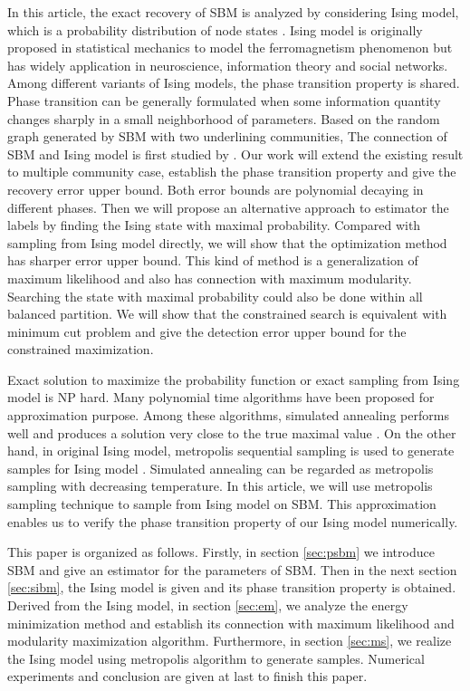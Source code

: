 \documentclass[journal]{IEEEtran}
\newcommand{\1}{\mathbbm{1}}
\begin{document}
In this article, the exact recovery of SBM is analyzed by considering
Ising model, which is a probability distribution of node states \cite{ising1925beitrag}.
Ising model is originally proposed in statistical mechanics to model the ferromagnetism phenomenon but has widely application in neuroscience, information theory
and social networks. Among different variants of Ising models, the phase transition property is shared. Phase transition can be generally formulated when
some information quantity changes sharply in a small neighborhood of parameters.
Based on the random graph generated by SBM with two underlining communities,
The connection of SBM and Ising model is first studied by \cite{ye2020exact}. Our work will extend the existing result to multiple community case, establish the phase transition
property and give the recovery error upper bound. Both error bounds are polynomial decaying in different phases.
Then we will propose an alternative approach to estimator the labels by finding the Ising state with maximal probability.
Compared with sampling from Ising model directly,
we will show that the optimization method has sharper error upper bound. This kind of method
is a generalization of maximum likelihood and also has connection with maximum modularity.
Searching the state with maximal probability
could also be done within all balanced partition. We will show that the constrained search is equivalent with minimum cut problem and give the detection
error upper bound for the constrained maximization.

Exact solution to maximize the probability function or exact sampling from Ising model is NP hard. Many polynomial time algorithms have been proposed for approximation purpose.
Among these algorithms, simulated annealing performs well and produces a solution very close to the true maximal value \cite{liu2010detecting}.
On the other hand, in original Ising model,
metropolis sequential sampling is used to generate samples for Ising model \cite{metropolis1953equation}. Simulated annealing can be regarded as metropolis sampling with decreasing temperature. In this article, we will
use metropolis sampling technique to sample from Ising model on SBM. This approximation enables us to verify the phase transition property of our Ising model  numerically.

This paper is organized as follows. Firstly, in section \ref{sec:psbm} we introduce SBM and give an estimator for the parameters of SBM.
Then in the next section \ref{sec:sibm}, the Ising model is given and its phase transition property is obtained.
Derived from the Ising model, in section \ref{sec:em}, we analyze the energy minimization method and establish its connection with maximum likelihood and modularity
maximization algorithm. Furthermore, in section \ref{sec:ms},
we realize the Ising model using metropolis algorithm to generate samples. Numerical experiments and conclusion are given at last to finish this paper.
\end{document}
